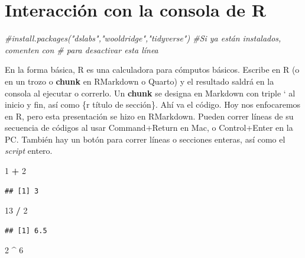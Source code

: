 \documentclass[
]{article}
\newenvironment{Shaded}{\begin{snugshade}}{\end{snugshade}}
\newcommand{\CommentTok}[1]{\textcolor[rgb]{0.56,0.35,0.01}{\textit{#1}}}
\newcommand{\DecValTok}[1]{\textcolor[rgb]{0.00,0.00,0.81}{#1}}
\newcommand{\SpecialCharTok}[1]{\textcolor[rgb]{0.81,0.36,0.00}{\textbf{#1}}}
\begin{document}
\section{Interacción con la consola de
R}\label{interacciuxf3n-con-la-consola-de-r}

\begin{Shaded}
\begin{Highlighting}[]
\CommentTok{\#install.packages("dslabs","wooldridge","tidyverse") \#Si ya están instalados, comenten con \textquotesingle{}\#\textquotesingle{} para desactivar esta línea}
\end{Highlighting}
\end{Shaded}

En la forma básica, R es una calculadora para cómputos básicos. Escribe
en R (o en un trozo o \textbf{chunk} en RMarkdown o Quarto) y el
resultado saldrá en la consola al ejecutar o correrlo. Un \textbf{chunk}
se designa en Markdown con triple ` al inicio y fin, así como \{r título
de sección\}. Ahí va el código. Hoy nos enfocaremos en R, pero esta
presentación se hizo en RMarkdown. Pueden correr líneas de su secuencia
de códigos al usar Command+Return en Mac, o Control+Enter en la PC.
También hay un botón para correr líneas o secciones enteras, así como el
\emph{script} entero.

\begin{Shaded}
\begin{Highlighting}[]
\DecValTok{1} \SpecialCharTok{+} \DecValTok{2}
\end{Highlighting}
\end{Shaded}

\begin{verbatim}
## [1] 3
\end{verbatim}

\begin{Shaded}
\begin{Highlighting}[]
\DecValTok{13} \SpecialCharTok{/} \DecValTok{2}
\end{Highlighting}
\end{Shaded}

\begin{verbatim}
## [1] 6.5
\end{verbatim}

\begin{Shaded}
\begin{Highlighting}[]
\DecValTok{2} \SpecialCharTok{\^{}} \DecValTok{6}
\end{Highlighting}
\end{Shaded}
\end{document}
